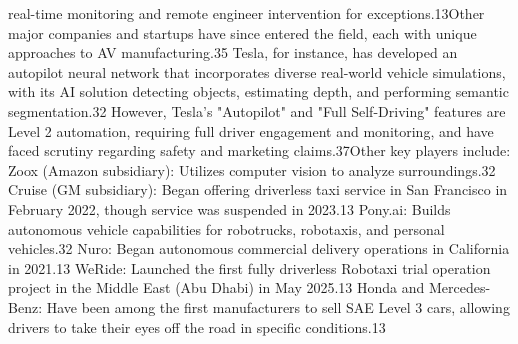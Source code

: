 real-time monitoring and remote engineer intervention for exceptions.13Other major companies and startups have since entered the field, each with unique approaches to AV manufacturing.35 Tesla, for instance, has developed an autopilot neural network that incorporates diverse real-world vehicle simulations, with its AI solution detecting objects, estimating depth, and performing semantic segmentation.32 However, Tesla's "Autopilot" and "Full Self-Driving" features are Level 2 automation, requiring full driver engagement and monitoring, and have faced scrutiny regarding safety and marketing claims.37Other key players include:
Zoox (Amazon subsidiary): Utilizes computer vision to analyze surroundings.32
Cruise (GM subsidiary): Began offering driverless taxi service in San Francisco in February 2022, though service was suspended in 2023.13
Pony.ai: Builds autonomous vehicle capabilities for robotrucks, robotaxis, and personal vehicles.32
Nuro: Began autonomous commercial delivery operations in California in 2021.13
WeRide: Launched the first fully driverless Robotaxi trial operation project in the Middle East (Abu Dhabi) in May 2025.13
Honda and Mercedes-Benz: Have been among the first manufacturers to sell SAE Level 3 cars, allowing drivers to take their eyes off the road in specific conditions.13
